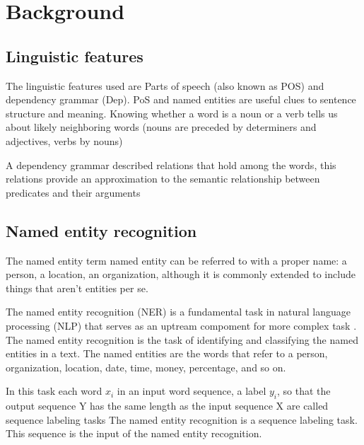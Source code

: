 \documentclass{IEEEtran}
\begin{document}


%
\IEEEpeerreviewmaketitle


\section{Background}

\subsection{Linguistic features}

The linguistic features used are Parts of speech (also known as POS) and dependency grammar (Dep). PoS and named entities are useful clues to sentence structure and meaning. Knowing whether a word is a noun or a verb tells us about likely neighboring words (nouns are preceded by determiners and adjectives, verbs by nouns)\cite{martin-2020-speech}

A dependency grammar described relations that hold among the words, this relations provide an approximation to the semantic relationship between predicates and their arguments\cite{martin-2020-speech}

\subsection{Named entity recognition}

The named entity term named entity can be referred to with a
proper name: a person, a location, an organization, although it
is commonly extended to include things that aren't entities per se\cite{martin-2020-speech}.

The named entity recognition (NER) is a fundamental task in natural language processing (NLP) that  serves as an uptream compoment for more complex task \cite{ma-etal-2022-label}. The named entity recognition is the task of identifying and classifying the named entities in a text. The named entities are the words that refer to a person, organization, location, date, time, money, percentage, and so on.

In this task each word $x_i$ in an input word sequence, a
label $y_i$, so that the output sequence Y has the same length as the input sequence X are called sequence labeling tasks
The named entity recognition is a sequence labeling task. This sequence is the input of the named entity recognition\cite{martin-2020-speech}.
\end{document}
